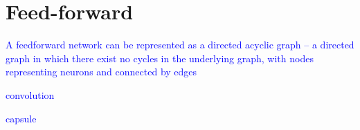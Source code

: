 \section{Feed-forward}

\textcolor{blue}{A feedforward network can be represented as a directed acyclic graph -- a directed graph in which there exist no cycles in the underlying graph, with nodes representing neurons and connected by edges}







\textcolor{blue}{convolution}

\textcolor{blue}{capsule}
